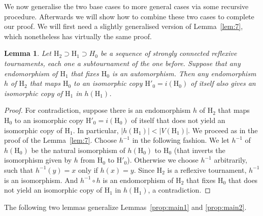 \documentclass[a4paper,12pt]{article}
\newtheorem{lemma}{Lemma}
\theoremstyle{remark}
\renewcommand{\H}{\ensuremath{\mathrm{H}}}
\begin{document}
We now generalise the two base cases to more general cases via some recursive procedure. Afterwards we will show how to combine these two cases to complete our proof.
We will first need a slightly generalised version of Lemma~\ref{lem:7}, which nonetheless has virtually the same proof.

\begin{lemma}
Let $\H_2 \supset \H_1 \supset H_0$ be a sequence of strongly connected reflexive tournaments, each one a subtournament of the one before. Suppose that any endomorphism of $\H_1$ that fixes $\H_0$ is an automorphism. Then any endomorphism $h$ of $\H_2$ that maps $\H_0$ to an isomorphic copy $\H'_0=i(\H_0)$ of itself also gives an isomorphic copy of $\H_1$ in $h(\H_1)$. 
\label{lem:8}
\end{lemma}
\begin{proof}
For contradiction, suppose there is an endomorphism $h$ of $\H_2$ that maps $\H_0$ to an isomorphic copy $\H'_0=i(\H_0)$ of itself that does not yield an isomorphic copy of $\H_1$. In particular, $|h(\H_1)|<|V(\H_1)|$. We proceed as in the proof of the Lemma~\ref{lem:7}. Choose $h^{-1}$ in the following fashion. We let $h^{-1}$ of $h(\H_0)$ be the natural isomorphism of $h(\H_0)$ to $\H_0$ (that inverts the isomorphism given by $h$ from $\H_0$ to $\H'_0$). Otherwise we choose $h^{-1}$ arbitrarily, such that $h^{-1}(y)=x$ only if $h(x)=y$. Since 
$\H_2$ is a reflexive tournament, $h^{-1}$ is an isomorphism. And $h^{-1} \circ h$ is an endomorphism of $\H_2$ that fixes $\H_0$ that does not yield an isomorphic copy of $\H_1$ in $h(\H_1)$, a contradiction.
\end{proof}

The following two lemmas generalize Lemmas~\ref{prop:main1} and \ref{prop:main2}.
\end{document}
